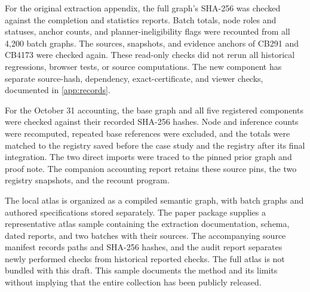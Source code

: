 For the original extraction appendix, the full graph's SHA-256 was checked against the completion and statistics reports. Batch totals, node roles and statuses, anchor counts, and planner-ineligibility flags were recounted from all 4,200 batch graphs. The sources, snapshots, and evidence anchors of CB291 and CB4173 were checked again. These read-only checks did not rerun all historical regressions, browser tests, or source computations. The new component has separate source-hash, dependency, exact-certificate, and viewer checks, documented in \cref{app:records}.

For the October 31 accounting, the base graph and all five registered components were checked against their recorded SHA-256 hashes. Node and inference counts were recomputed, repeated base references were excluded, and the totals were matched to the registry saved before the case study and the registry after its final integration. The two direct imports were traced to the pinned prior graph and proof note. The companion accounting report retains these source pins, the two registry snapshots, and the recount program.

The local atlas is organized as a compiled semantic graph, with batch graphs and authored specifications stored separately. The paper package supplies a representative atlas sample containing the extraction documentation, schema, dated reports, and two batches with their sources. The accompanying source manifest records paths and SHA-256 hashes, and the audit report separates newly performed checks from historical reported checks. The full atlas is not bundled with this draft. This sample documents the method and its limits without implying that the entire collection has been publicly released.

